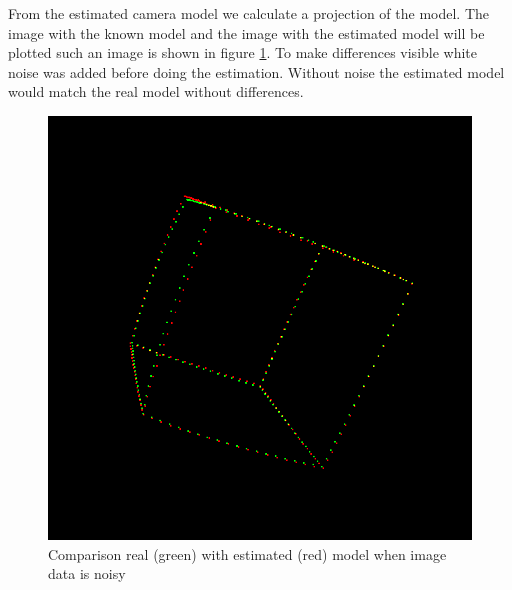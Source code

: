 \documentclass[11pt,a4paper,titlepage,oneside]{report}
\begin{document}
From the estimated camera model we calculate a projection of the model. The image with the known model and the image with the estimated model will be plotted such an image is shown in figure \ref{fig:diff_img}. To make differences visible white noise was added before doing the estimation. Without noise the estimated model would match the real model without differences.
\begin{figure}[H]
  \begin{center}
		\includegraphics[width=1.0\textwidth]{img/diff_img.png}
  \end{center}
	\caption{Comparison real (green) with estimated (red) model when image data is noisy}\label{fig:diff_img}
\end{figure}
\end{document}
